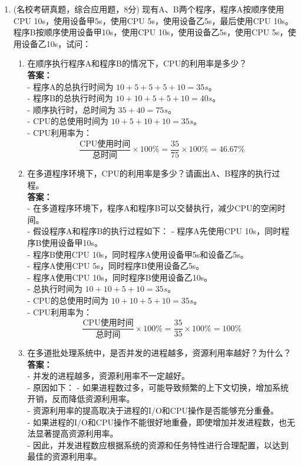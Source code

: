 \documentclass[lang=cn,newtx,10pt,scheme=chinese]{../../elegantbook}
\begin{document}
\begin{enumerate}
    \item (名校考研真题，综合应用题，8分) 现有A、B两个程序，程序A按顺序使用CPU 10s，使用设备甲5s，使用CPU 5s，使用设备乙5s，最后使用CPU 10s。程序B按顺序使用设备甲10s，使用CPU 10s，使用设备乙5s，使用CPU 5s，使用设备乙10s，试问：
    \begin{enumerate}
        \item 在顺序执行程序A和程序B的情况下，CPU的利用率是多少？\\
        \textbf{答案：}\\
        - 程序A的总执行时间为 \(10 + 5 + 5 + 5 + 10 = 35s\)。\\
        - 程序B的总执行时间为 \(10 + 10 + 5 + 5 + 10 = 40s\)。\\
        - 顺序执行时，总时间为 \(35 + 40 = 75s\)。\\
        - CPU的总使用时间为 \(10 + 5 + 10 + 10 = 35s\)。\\
        - CPU利用率为：
        \[
        \frac{\text{CPU使用时间}}{\text{总时间}} \times 100\% = \frac{35}{75} \times 100\% = 46.67\%
        \]

        \item 在多道程序环境下，CPU的利用率是多少？请画出A、B程序的执行过程。\\
        \textbf{答案：}\\
        - 在多道程序环境下，程序A和程序B可以交替执行，减少CPU的空闲时间。\\
        - 假设程序A和程序B的执行过程如下：
            - 程序A先使用CPU 10s，同时程序B使用设备甲10s。\\
            - 程序B使用CPU 10s，同时程序A使用设备甲5s和设备乙5s。\\
            - 程序A使用CPU 5s，同时程序B使用设备乙5s。\\
            - 程序A使用CPU 10s，同时程序B使用设备乙10s。\\
        - 总执行时间为 \(10 + 10 + 5 + 10 = 35s\)。\\
        - CPU的总使用时间为 \(10 + 10 + 5 + 10 = 35s\)。\\
        - CPU利用率为：
        \[
        \frac{\text{CPU使用时间}}{\text{总时间}} \times 100\% = \frac{35}{35} \times 100\% = 100\%
        \]

        \item 在多道批处理系统中，是否并发的进程越多，资源利用率越好？为什么？\\
        \textbf{答案：}\\
        - 并发的进程越多，资源利用率不一定越好。\\
        - 原因如下：
            - 如果进程数过多，可能导致频繁的上下文切换，增加系统开销，反而降低资源利用率。\\
            - 资源利用率的提高取决于进程的I/O和CPU操作是否能够充分重叠。\\
            - 如果进程的I/O和CPU操作不能很好地重叠，即使增加并发进程数，也无法显著提高资源利用率。\\
        - 因此，并发进程数应根据系统的资源和任务特性进行合理配置，以达到最佳的资源利用率。\\
    \end{enumerate}


\end{enumerate}
\end{document}
